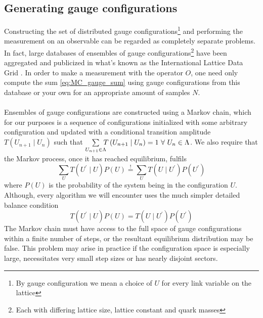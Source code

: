 \documentclass[a4paper,10pt]{book}
\begin{document}
\subsection{Generating gauge configurations}
Constructing the set of distributed gauge configurations\footnote{By gauge configuration we mean a choice of $U$ for every link variable on the lattice} and performing the measurement on an observable can be regarded as completely separate problems. In fact, large databases of ensembles of gauge configurations\footnote{Each with differing lattice size, lattice constant and quark masses} have been aggregated and publicized in what's known as the International Lattice Data Grid \cite{Beckett_2011}. In order to make a measurement with the operator $O$, one need only compute the sum \eqref{eq:MC_gauge_sum} using gauge configurations from this database or your own for an appropriate amount of samples $N$.\\\\Ensembles of gauge configurations are constructed using a Markov chain, which for our purposes is a sequence of configurations initialized with some arbitrary configuration and updated with a conditional transition amplitude $T\left( U_{n+1} \mid U_{n} \right)$ such that $\sum\limits_{U_{n+1} \in \Lambda}\mkern-10mu T\left( U_{n+1} \mid U_{n} \right) = 1 \,\,\forall\,\, U_{n} \in \Lambda $. We also require that the Markov process, once it has reached equilibrium, fulfils 
\begin{equation}
\sum_{U} T\left(U^{\prime} \mid U\right) P(U) \stackrel{!}{=} \sum_{U} T\left(U \mid U^{\prime}\right) P\left(U^{\prime}\right)
\end{equation}
where $P(U)$ is the probability of the system being in the configuration $U$. Although, every algorithm we will encounter uses the much simpler detailed balance condition
\begin{equation}
T\left(U^{\prime} \mid U\right) P(U) =  T\left(U \mid U^{\prime}\right) P\left(U^{\prime}\right)
\end{equation}
The Markov chain must have access to the full space of gauge configurations within a finite number of steps, or the resultant equilibrium distribution may be false. This problem may arise in practice if the configuration space is especially large, necessitates very small step sizes or has nearly disjoint sectors.
\end{document}
